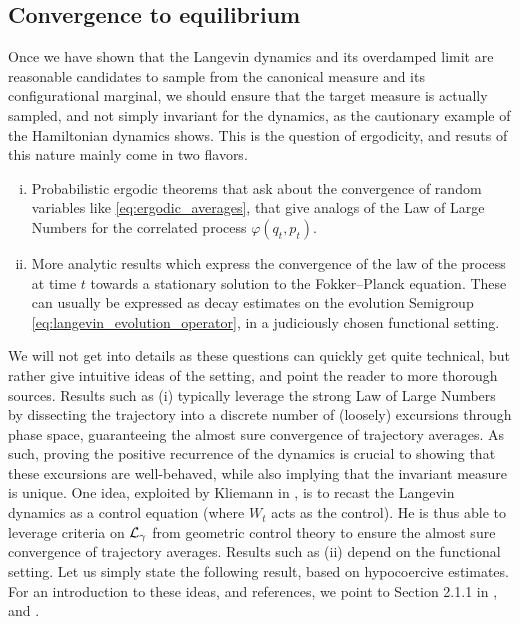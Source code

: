         \subsection{Convergence to equilibrium}
        Once we have shown that the Langevin dynamics and its overdamped limit are reasonable candidates to sample from the canonical measure and its configurational marginal,
        we should ensure that the target measure is actually sampled, and not simply invariant for the dynamics, as the cautionary example of the Hamiltonian dynamics shows.
        This is the question of ergodicity, and resuts of this nature mainly come in two flavors.
        \begin{enumerate}[(i)]
            \item Probabilistic ergodic theorems that ask about the convergence of random variables like \eqref{eq:ergodic_averages}, that give analogs of the Law of Large Numbers for the correlated process $\varphi(q_t,p_t)$.
            \item More analytic results which express the convergence of the law of the process at time $t$ towards a stationary solution to the Fokker--Planck equation. These can usually be expressed as decay estimates on the evolution Semigroup \eqref{eq:langevin_evolution_operator}, in a judiciously chosen functional setting.
        \end{enumerate}
        We will not get into details as these questions can quickly get quite technical, but rather give intuitive ideas of the setting, and point the reader to more thorough sources.
        Results such as (i) typically leverage the strong Law of Large Numbers by dissecting the trajectory into a discrete number of (loosely) \iid excursions through phase space, guaranteeing the almost sure convergence of trajectory averages.
        As such, proving the positive recurrence of the dynamics is crucial to showing that these excursions are well-behaved, while also implying that the invariant measure is unique.
        One idea, exploited by Kliemann in \cite{K87}, is to recast the Langevin dynamics as a control equation (where $W_t$ acts as the control). 
        He is thus able to leverage criteria on $\mathcal{L}_\gamma$ from geometric control theory to ensure the almost sure convergence of trajectory averages.
        Results such as (ii) depend on the functional setting. Let us simply state the following result, based on hypocoercive estimates. 
        For an introduction to these ideas, and references, we point to Section 2.1.1 in \cite{LMS13}, and \cite{DMS15}.
